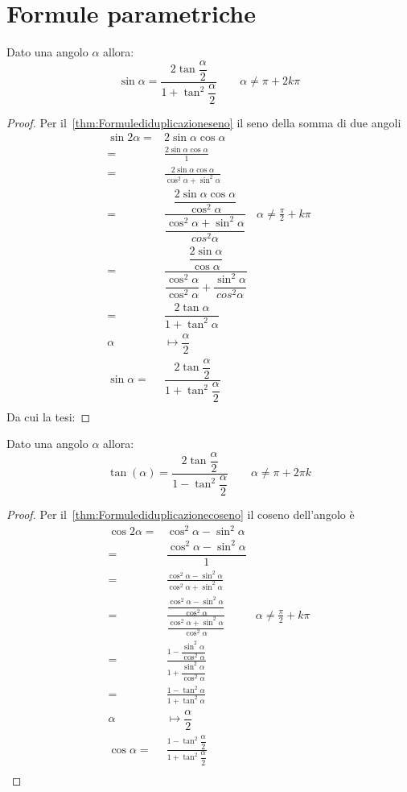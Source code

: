 \section{Formule parametriche}
\begin{thm}\label{thm:senotangentemeta}
	Dato una angolo $\alpha$  allora:
\[\sin\alpha=\dfrac{2\tan\dfrac{\alpha}{2}}{1+\tan^2\dfrac{\alpha}{2}}\qquad\alpha\neq\pi+2k\pi \]
\end{thm}
\begin{proof}
	Per il~\vref{thm:Formulediduplicazioneseno} il seno della somma di due angoli 
	\begin{align*}
	\sin2\alpha=&2\sin\alpha\cos\alpha\\
	=&\frac{2\sin\alpha\cos\alpha}{1}\\
	=&\frac{2\sin\alpha\cos\alpha}{\cos^2\alpha+\sin^2\alpha}\\
	=&\dfrac{\dfrac{2\sin\alpha\cos\alpha}{\cos^2\alpha}}{\dfrac{\cos^2\alpha+\sin^2\alpha}{cos^2\alpha}}&\alpha\neq\frac{\pi}{2}+k\pi\\
	=&\dfrac{\dfrac{2\sin\alpha}{\cos\alpha}}{\dfrac{\cos^2\alpha}{\cos^2\alpha}+\dfrac{\sin^2\alpha}{cos^2\alpha}}\\
	=&\dfrac{2\tan\alpha}{1+\tan^2\alpha}\\
	\alpha&\longmapsto\dfrac{\alpha}{2}\\
	\sin\alpha=&\dfrac{2\tan\dfrac{\alpha}{2}}{1+\tan^2\dfrac{\alpha}{2}}\\
	\end{align*}
Da cui la tesi:
\end{proof}
\begin{thm}\label{thm:cosenotangentemeta}
	Dato una angolo $\alpha$  allora:
	\[\tan\left(\alpha\right)=\dfrac{2\tan\dfrac{\alpha}{2}}{1-\tan^2\dfrac{\alpha}{2}}\qquad\alpha\neq\pi+2\pi k\]
\end{thm}
\begin{proof}
Per il~\vref{thm:Formulediduplicazionecoseno} il coseno dell'angolo è
\begin{align*}
\cos 2\alpha=&\cos^2\alpha-\sin^2\alpha\\
=&\dfrac{\cos^2\alpha-\sin^2\alpha}{1}\\
=&\frac{\cos^2\alpha-\sin^2\alpha}{\cos^2\alpha+\sin^2\alpha}\\
=&\frac{\dfrac{\cos^2\alpha-\sin^2\alpha}{\cos^2\alpha}}{\dfrac{\cos^2\alpha+\sin^2\alpha}{\cos^2\alpha}}&\alpha\neq\frac{\pi}{2}+k\pi\\ 
=&\frac{1-\dfrac{\sin^2\alpha}{\cos^2\alpha}}{1+\dfrac{\sin^2\alpha}{\cos^2\alpha}}\\
=&\frac{1-\tan^2\alpha}{1+\tan^2\alpha}\\
\alpha&\longmapsto\dfrac{\alpha}{2}\\
\cos\alpha=&\frac{1-\tan^2\dfrac{\alpha}{2}}{1+\tan^2\dfrac{\alpha}{2}}\\
\end{align*}
\end{proof}
